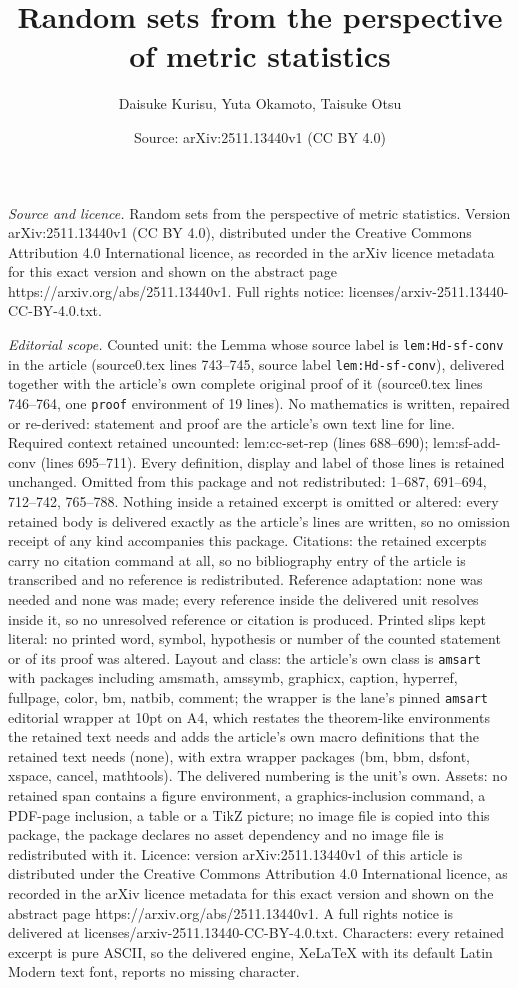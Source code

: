 \documentclass[10pt,a4paper]{amsart}
\title[Random sets from the perspective of metric statistics]{Random sets from the perspective of metric statistics}
\author{Daisuke Kurisu, Yuta Okamoto, Taisuke Otsu}
\date{Source: arXiv:2511.13440v1 (CC BY 4.0)}
\begin{document}
\maketitle

\noindent\emph{Source and licence.} Random sets from the perspective of metric statistics. Version arXiv:2511.13440v1 (CC BY 4.0), distributed under the Creative Commons Attribution 4.0 International licence, as recorded in the arXiv licence metadata for this exact version and shown on the abstract page https://arxiv.org/abs/2511.13440v1. Full rights notice: licenses/arxiv-2511.13440-CC-BY-4.0.txt.\par\smallskip

\noindent\textit{Editorial scope.} Counted unit: the Lemma whose source label is \texttt{lem:Hd-sf-conv} in the article (source0.tex lines 743--745, source label \texttt{lem:Hd-sf-conv}), delivered together with the article's own complete original proof of it (source0.tex lines 746--764, one \texttt{proof} environment of 19 lines). No mathematics is written, repaired or re-derived: statement and proof are the article's own text line for line. Required context retained uncounted: lem:cc-set-rep (lines 688--690); lem:sf-add-conv (lines 695--711). Every definition, display and label of those lines is retained unchanged. Omitted from this package and not redistributed: 1--687, 691--694, 712--742, 765--788. Nothing inside a retained excerpt is omitted or altered: every retained body is delivered exactly as the article's lines are written, so no omission receipt of any kind accompanies this package. Citations: the retained excerpts carry no citation command at all, so no bibliography entry of the article is transcribed and no reference is redistributed. Reference adaptation: none was needed and none was made; every reference inside the delivered unit resolves inside it, so no unresolved reference or citation is produced. Printed slips kept literal: no printed word, symbol, hypothesis or number of the counted statement or of its proof was altered. Layout and class: the article's own class is \texttt{amsart} with packages including amsmath, amssymb, graphicx, caption, hyperref, fullpage, color, bm, natbib, comment; the wrapper is the lane's pinned \texttt{amsart} editorial wrapper at 10pt on A4, which restates the theorem-like environments the retained text needs and adds the article's own macro definitions that the retained text needs (none), with extra wrapper packages (bm, bbm, dsfont, xspace, cancel, mathtools). The delivered numbering is the unit's own. Assets: no retained span contains a figure environment, a graphics-inclusion command, a PDF-page inclusion, a table or a TikZ picture; no image file is copied into this package, the package declares no asset dependency and no image file is redistributed with it. Licence: version arXiv:2511.13440v1 of this article is distributed under the Creative Commons Attribution 4.0 International licence, as recorded in the arXiv licence metadata for this exact version and shown on the abstract page https://arxiv.org/abs/2511.13440v1. A full rights notice is delivered at licenses/arxiv-2511.13440-CC-BY-4.0.txt. Characters: every retained excerpt is pure ASCII, so the delivered engine, XeLaTeX with its default Latin Modern text font, reports no missing character.
\end{document}
